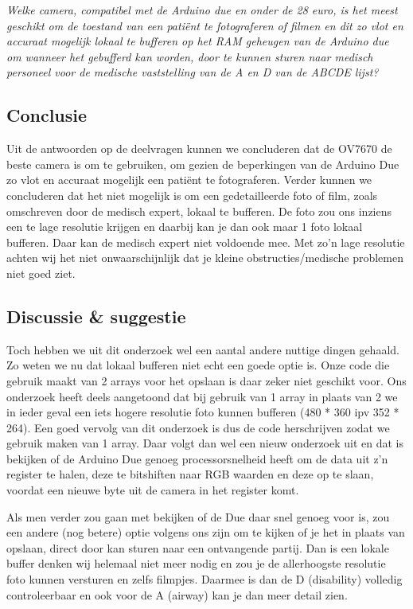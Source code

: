 \documentclass{article}
\begin{document}
\textit{Welke camera, compatibel met de Arduino due en onder de 28 euro, is het meest geschikt om de toestand van een patiënt te fotograferen of filmen en dit zo vlot en accuraat mogelijk lokaal te bufferen op het RAM geheugen van de Arduino due om wanneer het gebufferd kan worden, door te kunnen sturen naar medisch personeel voor de medische vaststelling van de A en D van de ABCDE lijst?}
\subsection{Conclusie}
Uit de antwoorden op de deelvragen kunnen we concluderen dat de OV7670 de beste camera is om te gebruiken, om gezien de beperkingen van de Arduino Due zo vlot en accuraat mogelijk een patiënt te fotograferen. Verder kunnen we concluderen dat het niet mogelijk is om een gedetailleerde foto of film, zoals omschreven door de medisch expert, lokaal te bufferen. De foto zou ons inziens een te lage resolutie krijgen en daarbij kan je dan ook maar 1 foto lokaal bufferen. Daar kan de medisch expert niet voldoende mee. Met zo’n lage resolutie achten wij het niet onwaarschijnlijk dat je kleine obstructies/medische problemen niet goed ziet.

\subsection{Discussie \& suggestie}
Toch hebben we uit dit onderzoek wel een aantal andere nuttige dingen gehaald. Zo weten we nu dat lokaal bufferen niet echt een goede optie is. Onze code die gebruik maakt van 2 arrays voor het opslaan is daar zeker niet geschikt voor. Ons onderzoek heeft deels aangetoond dat bij gebruik van 1 array in plaats van 2 we in ieder geval een iets hogere resolutie foto kunnen bufferen (480 * 360 ipv 352 * 264). Een goed vervolg van dit onderzoek is dus de code herschrijven zodat we gebruik maken van 1 array. Daar volgt dan wel een nieuw onderzoek uit en dat is bekijken of de Arduino Due genoeg processorsnelheid heeft om de data uit z’n register te halen, deze te bitshiften naar RGB waarden en deze op te slaan, voordat een nieuwe byte uit de camera in het register komt.

Als men verder zou gaan met bekijken of de Due daar snel genoeg voor is, zou een andere (nog betere) optie volgens ons zijn om te kijken of je het in plaats van opslaan, direct door kan sturen naar een ontvangende partij. Dan is een lokale buffer denken wij helemaal niet meer nodig en zou je de allerhoogste resolutie foto kunnen versturen en zelfs filmpjes. Daarmee is dan de D (disability) volledig controleerbaar en ook voor de A (airway) kan je dan meer detail zien.
\end{document}
